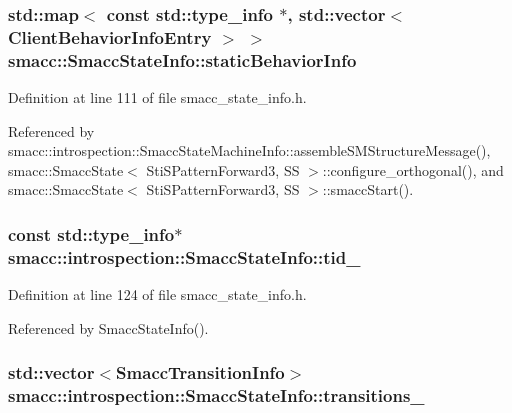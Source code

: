 \subsubsection[{\texorpdfstring{static\+Behavior\+Info}{staticBehaviorInfo}}]{\setlength{\rightskip}{0pt plus 5cm}std\+::map$<$ const std\+::type\+\_\+info $\ast$, std\+::vector$<$ {\bf Client\+Behavior\+Info\+Entry} $>$ $>$ smacc\+::\+Smacc\+State\+Info\+::static\+Behavior\+Info\hspace{0.3cm}{\ttfamily [static]}}\hypertarget{classsmacc_1_1introspection_1_1SmaccStateInfo_ad3d8b3450060cb0b91f38fb2fe0a7678}{}\label{classsmacc_1_1introspection_1_1SmaccStateInfo_ad3d8b3450060cb0b91f38fb2fe0a7678}


Definition at line 111 of file smacc\+\_\+state\+\_\+info.\+h.



Referenced by smacc\+::introspection\+::\+Smacc\+State\+Machine\+Info\+::assemble\+S\+M\+Structure\+Message(), smacc\+::\+Smacc\+State$<$ Sti\+S\+Pattern\+Forward3, S\+S $>$\+::configure\+\_\+orthogonal(), and smacc\+::\+Smacc\+State$<$ Sti\+S\+Pattern\+Forward3, S\+S $>$\+::smacc\+Start().

\subsubsection[{\texorpdfstring{tid\+\_\+}{tid_}}]{\setlength{\rightskip}{0pt plus 5cm}const std\+::type\+\_\+info$\ast$ smacc\+::introspection\+::\+Smacc\+State\+Info\+::tid\+\_\+}\hypertarget{classsmacc_1_1introspection_1_1SmaccStateInfo_a37d0d0bce171b57b8d3a39f44ab45248}{}\label{classsmacc_1_1introspection_1_1SmaccStateInfo_a37d0d0bce171b57b8d3a39f44ab45248}


Definition at line 124 of file smacc\+\_\+state\+\_\+info.\+h.



Referenced by Smacc\+State\+Info().

\subsubsection[{\texorpdfstring{transitions\+\_\+}{transitions_}}]{\setlength{\rightskip}{0pt plus 5cm}std\+::vector$<${\bf Smacc\+Transition\+Info}$>$ smacc\+::introspection\+::\+Smacc\+State\+Info\+::transitions\+\_\+}\hypertarget{classsmacc_1_1introspection_1_1SmaccStateInfo_ae8b5d8e409e377ef9a88d92fb31a8446}{}\label{classsmacc_1_1introspection_1_1SmaccStateInfo_ae8b5d8e409e377ef9a88d92fb31a8446}


